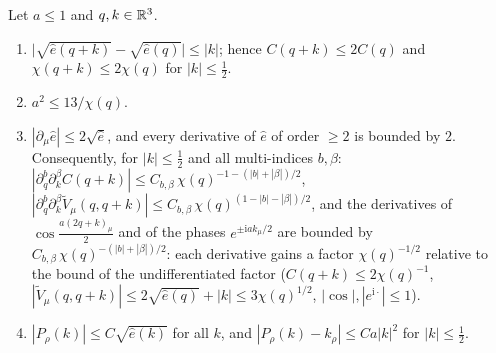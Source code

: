 \begin{lemma}\label{lem:a05:EB}
Let $a\le1$ and $q,k\in\mathbb R^3$.
\begin{enumerate}[label=\textup{(\roman*)},nosep,leftmargin=*]
\item $\big|\sqrt{\hat e(q+k)}-\sqrt{\hat e(q)}\big|\le|k|$; hence $C(q+k)\le2C(q)$ and $\chi(q+k)\le2\chi(q)$ for $|k|\le\frac12$.
\item $a^2\le13/\chi(q)$.
\item $|\partial_\mu\hat e|\le2\sqrt{\hat e}$, and every derivative of $\hat e$ of order $\ge2$ is bounded by $2$. Consequently, for $|k|\le\frac12$ and all multi-indices $b,\beta$: $|\partial^b_q\partial^\beta_kC(q+k)|\le C_{b,\beta}\,\chi(q)^{-1-(|b|+|\beta|)/2}$, $|\partial^b_q\partial^\beta_k\tilde V_\mu(q,q+k)|\le C_{b,\beta}\,\chi(q)^{(1-|b|-|\beta|)/2}$, and the derivatives of $\cos\frac{a(2q+k)_\mu}2$ and of the phases $e^{\pm\mathrm iak_\mu/2}$ are bounded by $C_{b,\beta}\,\chi(q)^{-(|b|+|\beta|)/2}$: each derivative gains a factor $\chi(q)^{-1/2}$ relative to the bound of the undifferentiated factor ($C(q+k)\le2\chi(q)^{-1}$, $|\tilde V_\mu(q,q+k)|\le2\sqrt{\hat e(q)}+|k|\le3\chi(q)^{1/2}$, $|\cos|,|e^{\mathrm i\cdot}|\le1$).
\item $|P_\rho(k)|\le C\sqrt{\hat e(k)}$ for all $k$, and $|P_\rho(k)-k_\rho|\le Ca|k|^2$ for $|k|\le\frac12$.
\end{enumerate}
\end{lemma}
